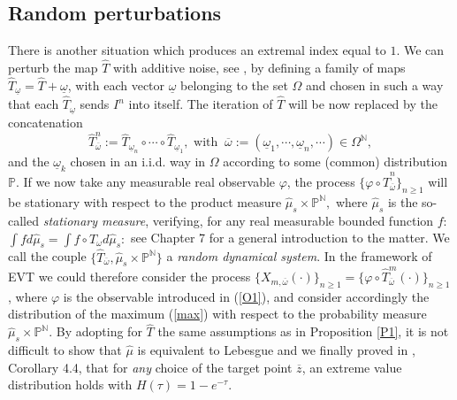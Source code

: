 \documentclass[12pt,reqno,a4paper]{amsart}
\let\phi\varphi
\newcommand{\T}{{\mathcal{T}}}
\def\o{\omega}   \def\O{\Omega}
\def\oz{\overline{z}}
\def\O{\ensuremath{O}}
\def\o{\ensuremath{\underline{\omega}}}
\def\T{\hat{T}}
\def\oom{\overline{\omega}}
\begin{document}
\subsection{Random perturbations}
There is  another situation which produces an extremal index equal to $1$. We can perturb the map $\hat{T}$ with additive noise, see \cite{AFV},  by defining a family of maps $\T_{\o}=\T+\o$, with each vector  $\o$ belonging to the set $\Omega$ and chosen in such a way that each $\T_{\o}$ sends $I^n$ into itself. The iteration of $\hat{T}$ will be now replaced by the concatenation
\[
\hat{T}^n_{\oom}:=\hat{T}_{\o_n}\circ \cdots \circ \hat{T}_{\o_1},\text{ with } \ \oom:=(\o_1, \cdots, \o_n, \cdots)\in \Omega^{\mathbb{N}},
\]
and the $\o_k$ chosen in an i.i.d. way in $\Omega$ according to some (common) distribution $\mathbb{P}.$ If we now take any measurable real observable $\phi$, the process $\{\phi\circ \hat{T}^n_{\oom}\}_{n\ge 1}$ will be stationary with respect to the product measure $\hat{\mu}_s\times \mathbb{P}^{\mathbb{N}},$ where $\hat{\mu}_s$ is the so-called {\em stationary measure}, verifying,  for any real measurable bounded function $f$: $\int f d\hat{\mu}_s=\int f\circ \hat{T}_{\omega}d\hat{\mu}_s:$  see \cite{ERDS} Chapter 7 for a general introduction to the matter. We call the couple $\{\hat{T}_{\oom}, \hat{\mu}_s\times \mathbb{P}^{\mathbb{N}}\}$ a {\em random dynamical system}. In the framework of EVT we could therefore consider the process $\{X_{m,\oom}(\cdot)\}_{n\ge1}=\{\phi \circ \hat{T}^m_{\oom}(\cdot)\}_{n\ge1}$, where $\phi$ is the observable introduced in (\ref{O1}), and consider  accordingly the distribution of the maximum (\ref{max}) with respect to the probability measure $\hat{\mu}_s\times \mathbb{P}^{\mathbb{N}}.$ By adopting for $\hat{T}$ the same assumptions as in Proposition \ref{P1}, it is not difficult  to show that $\hat{\mu}$ is equivalent to Lebesgue and we finally  proved in \cite{AFV}, Corollary 4.4, that for {\em any} choice of the target point $\oz$, an extreme value distribution holds with $H(\tau)=1-e^{-\tau}.$
\end{document}
